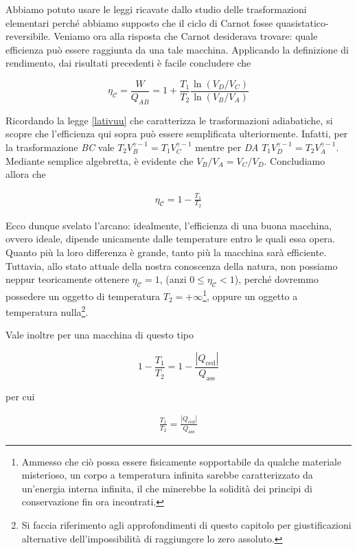 \noindent Abbiamo potuto usare le leggi ricavate dallo studio delle
trasformazioni elementari perché abbiamo supposto che il ciclo di
Carnot fosse quasistatico-reversibile. Veniamo ora alla risposta che
Carnot desiderava trovare: quale efficienza può essere raggiunta da
una tale macchina. Applicando la definizione di rendimento, dai
risultati precedenti è facile concludere che

\[ \eta_\mathcal{C} = \frac{W}{Q_{AB}} = 1 + \frac{T_1}{T_2}\frac{\ln(V_D/V_C)}{\ln(V_B/V_A)} \]

\noindent Ricordando la legge \ref{lativuu} che caratterizza le
trasformazioni adiabatiche, si scopre che l'efficienza qui sopra può
essere semplificata ulteriormente. Infatti, per la trasformazione
\textit{BC} vale $T_2V_B^{\gamma - 1} = T_1V_C^{\gamma - 1}$ mentre
per \textit{DA} $T_1V_D^{\gamma - 1} = T_2V_A^{\gamma - 1}$. Mediante
semplice algebretta, è evidente che $V_B/V_A = V_C/V_D$. Concludiamo
allora che

\begin{align}
    \eta_\mathcal{C} = 1 - \frac{T_1}{T_2}
\end{align}

Ecco dunque svelato l'arcano: idealmente, l'efficienza di una buona
macchina, ovvero ideale, dipende unicamente dalle temperature entro
le quali essa opera. Quanto più la loro differenza è grande, tanto
più la macchina sarà efficiente. Tuttavia, allo stato attuale della
nostra conoscenza della natura, non possiamo neppur teoricamente
ottenere $\eta_\mathcal{C} = 1$, (anzi $0 \leq \eta_\mathcal{C} < 1$),
perché dovremmo possedere un oggetto di temperatura $T_2 = +\infty$\footnote{Ammesso che ciò possa essere fisicamente sopportabile da qualche materiale misterioso, un corpo a temperatura infinita sarebbe
caratterizzato da un'energia interna infinita, il che minerebbe la
solidità dei principi di conservazione fin ora incontrati.},
oppure un oggetto a temperatura nulla\footnote{Si faccia
riferimento agli approfondimenti di questo capitolo per giustificazioni
alternative dell'impossibilità di raggiungere lo zero assoluto.}.

Vale inoltre per una macchina di questo tipo

\[ 1 - \frac{T_1}{T_2} = 1 - \frac{|Q_\text{ced}|}{Q_\text{ass}} \]

\noindent per cui

\begin{align}
    \frac{T_1}{T_2} = \frac{|Q_\text{ced}|}{Q_\text{ass}}
\end{align}



